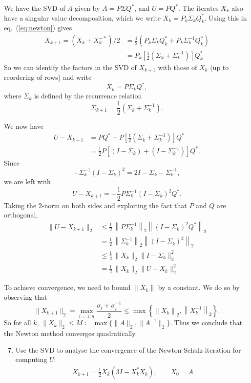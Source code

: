 \documentclass[10pt, A4paper]{article}
\begin{document}
We have the SVD of $A$ given by $A = P\Sigma Q^*$, and $U = PQ^*$.
The iterates $X_k$ also have a singular value decomposition, which we 
write $X_k=P_k \Sigma_k Q_k^*$. Using this in eq.~(\ref{eq:newton}) 
gives
\begin{align*}
	X_{k+1} = (X_k + X_k^{-*})/2 &= \frac{1}{2} (P_k \Sigma_k Q_k^* + 
	P_k \Sigma_k^{-1} Q_k^*)\\
	&= P_k \left[\frac{1}{2}(\Sigma_k + \Sigma_k^{-1})\right] Q_k^*
\end{align*}
So we can identify the factors in the SVD of $X_{k+1}$ with those of 
$X_k$ (up to reordering of rows) and write 
$$X_k = P \Sigma_k Q^*,$$
where $\Sigma_k$ is defined by the recurrence relation
$$
	\Sigma_{k+1} = \frac{1}{2} \left(\Sigma_k + \Sigma_k^{-1} \right).
$$

We now have
\begin{align*}
	U - X_{k+1} &= PQ^* - P\left[\frac{1}{2}
	\left(\Sigma_k + \Sigma_k^{-1}\right)\right] Q^* \\
	&= \frac{1}{2} P \left[\left(I - \Sigma_k\right) + 
	\left(I - \Sigma_k^{-1}\right) \right] Q^*.
\end{align*}
Since
$$
	- \Sigma_k^{-1} (I - \Sigma_k)^2 = 2I -\Sigma_k - \Sigma_k^{-1},
$$
we are left with $$U - X_{k+1} = -\frac{1}{2} P \Sigma_k^{-1} 
\left( I - \Sigma_k \right)^2 Q^*.$$
Taking the 2-norm on both sides and exploiting the fact that $P$ and 
$Q$ are orthogonal,
\begin{align*}
	\| U - X_{k+1} \|_2 &\leq \frac{1}{2}\, \left\| P\Sigma_k^{-1} 
	\right\|_2 \left\| (I - \Sigma_k)^2 Q^*\right\|_2 \\
	&= \frac{1}{2}\, \left\|\Sigma_k^{-1}\right\|_2 \left\| \left( I - 
	\Sigma_k \right)^2 \right\|_2 \\
	&\leq \frac{1}{2}\, \|X_k\|_2 \|I - \Sigma_k\|_2^2 \\
	&= \frac{1}{2}\, \|X_k\|_2 \|U - X_k\|_2^2
\end{align*}

To achieve convergence, we need to bound $\|X_k\|$ by a 
constant. We do so by observing that
$$
	\|X_{k+1}\|_2 = \max_{i = 1:n} \frac{\sigma_i + \sigma_i^{-1}}{2}
	\leq \max \left\{ \left\|X_k \right\|_2
	, \left\|X_k^{-1} \right\|_2 \right\}.
$$
So for all $k$, $\|X_k\|_2 \leq M \coloneqq \max\{\|A\|_2, 
\|A^{-1}\|_2\}$.
Thus we conclude that the Newton method converges quadratically.





\vspace{0.2cm}
\begin{enumerate}
	\setcounter{enumi}{6}
	\item Use the SVD to analyse the convergence of the
	Newton\nobreakdash-Schulz iteration for computing $U$:
	\begin{align*}
		X_{k+1} = \frac{1}{2}X_k(3I - X_k^* X_k), \qquad X_0 = A
	\end{align*}
\end{enumerate}
\end{document}
